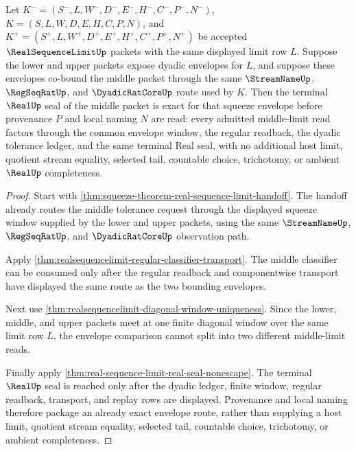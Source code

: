 \begin{theorem}\label{thm:real-sequence-limit-squeeze-envelope-exactness}
Let $K^-=(S^-,L,W^-,D^-,E^-,H^-,C^-,P^-,N^-)$, $K=(S,L,W,D,E,H,C,P,N)$, and $K^+=(S^+,L,W^+,D^+,E^+,H^+,C^+,P^+,N^+)$ be accepted $\RealSequenceLimitUp$ packets with the same displayed limit row $L$. Suppose the lower and upper packets expose dyadic envelopes for $L$, and suppose these envelopes co-bound the middle packet through the same $\StreamNameUp$, $\RegSeqRatUp$, and $\DyadicRatCoreUp$ route used by $K$. Then the terminal $\RealUp$ seal of the middle packet is exact for that squeeze envelope before provenance $P$ and local naming $N$ are read: every admitted middle-limit read factors through the common envelope window, the regular readback, the dyadic tolerance ledger, and the same terminal Real seal, with no additional host limit, quotient stream equality, selected tail, countable choice, trichotomy, or ambient $\RealUp$ completeness.
\end{theorem}
\begin{proof}
Start with \autoref{thm:squeeze-theorem-real-sequence-limit-handoff}. The handoff already routes the middle tolerance request through the displayed squeeze window supplied by the lower and upper packets, using the same $\StreamNameUp$, $\RegSeqRatUp$, and $\DyadicRatCoreUp$ observation path.

Apply \autoref{thm:realsequencelimit-regular-classifier-transport}. The middle classifier can be consumed only after the regular readback and componentwise transport have displayed the same route as the two bounding envelopes.

Next use \autoref{thm:realsequencelimit-diagonal-window-uniqueness}. Since the lower, middle, and upper packets meet at one finite diagonal window over the same limit row $L$, the envelope comparison cannot split into two different middle-limit reads.

Finally apply \autoref{thm:real-sequence-limit-real-seal-nonescape}. The terminal $\RealUp$ seal is reached only after the dyadic ledger, finite window, regular readback, transport, and replay rows are displayed. Provenance and local naming therefore package an already exact envelope route, rather than supplying a host limit, quotient stream equality, selected tail, countable choice, trichotomy, or ambient completeness.
\end{proof}


